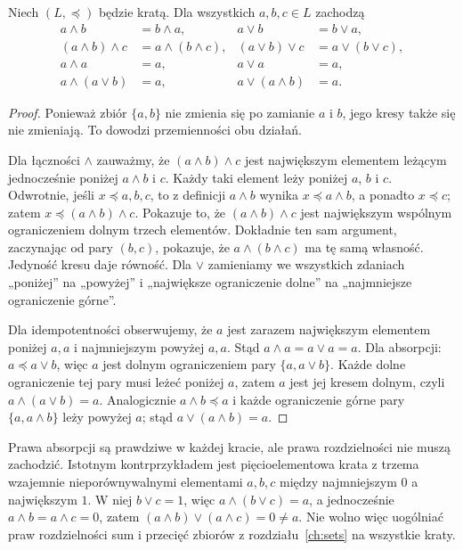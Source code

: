 \begin{twierdzenie}\label{thm:lattice-laws}
Niech $(L,\preceq)$ będzie kratą. Dla wszystkich
$a,b,c\in L$ zachodzą
\begin{align*}
 a\wedge b&=b\wedge a,&a\vee b&=b\vee a,\\
 (a\wedge b)\wedge c&=a\wedge(b\wedge c),&
 (a\vee b)\vee c&=a\vee(b\vee c),\\
 a\wedge a&=a,&a\vee a&=a,\\
 a\wedge(a\vee b)&=a,&a\vee(a\wedge b)&=a.
\end{align*}
\end{twierdzenie}
\begin{proof}
Ponieważ zbiór $\{a,b\}$ nie zmienia się po zamianie
$a$ i $b$, jego kresy także się nie zmieniają.
To dowodzi przemienności obu działań.

Dla łączności $\wedge$ zauważmy, że
$(a\wedge b)\wedge c$ jest największym elementem
leżącym jednocześnie poniżej $a\wedge b$ i $c$.
Każdy taki element leży poniżej $a$, $b$ i $c$.
Odwrotnie, jeśli $x\preceq a,b,c$, to z definicji
$a\wedge b$ wynika $x\preceq a\wedge b$, a ponadto
$x\preceq c$; zatem $x\preceq(a\wedge b)\wedge c$.
Pokazuje to, że $(a\wedge b)\wedge c$ jest
największym wspólnym ograniczeniem dolnym trzech
elementów. Dokładnie ten sam argument, zaczynając
od pary $(b,c)$, pokazuje, że $a\wedge(b\wedge c)$
ma tę samą własność. Jedyność kresu daje równość.
Dla $\vee$ zamieniamy we wszystkich zdaniach
„poniżej” na „powyżej” i „największe ograniczenie dolne”
na „najmniejsze ograniczenie górne”.

Dla idempotentności obserwujemy, że $a$ jest zarazem
największym elementem poniżej $a,a$ i najmniejszym
powyżej $a,a$. Stąd $a\wedge a=a\vee a=a$.
Dla absorpcji: $a\preceq a\vee b$, więc $a$ jest
dolnym ograniczeniem pary $\{a,a\vee b\}$.
Każde dolne ograniczenie tej pary musi leżeć poniżej $a$,
zatem $a$ jest jej kresem dolnym, czyli
$a\wedge(a\vee b)=a$. Analogicznie
$a\wedge b\preceq a$ i każde ograniczenie górne
pary $\{a,a\wedge b\}$ leży powyżej $a$;
stąd $a\vee(a\wedge b)=a$.
\end{proof}

\begin{uwaga}
Prawa absorpcji są prawdziwe w każdej kracie, ale
prawa rozdzielności nie muszą zachodzić. Istotnym
kontrprzykładem jest pięcioelementowa krata z trzema
wzajemnie nieporównywalnymi elementami $a,b,c$ między
najmniejszym $0$ a największym $1$.
W niej $b\vee c=1$, więc $a\wedge(b\vee c)=a$,
a jednocześnie $a\wedge b=a\wedge c=0$, zatem
$(a\wedge b)\vee(a\wedge c)=0\ne a$.
Nie wolno więc uogólniać praw rozdzielności sum i
przecięć zbiorów z rozdziału~\ref{ch:sets} na wszystkie kraty.
\end{uwaga}

